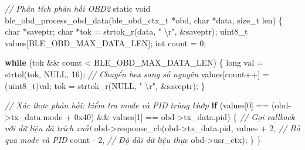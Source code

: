 \documentclass[a4paper]{extarticle}
\newenvironment{Shaded}{}{}
\newcommand{\BaseNTok}[1]{\textcolor[rgb]{0.25,0.63,0.44}{#1}}
\newcommand{\CommentTok}[1]{\textcolor[rgb]{0.38,0.63,0.69}{\textit{#1}}}
\newcommand{\ControlFlowTok}[1]{\textcolor[rgb]{0.00,0.44,0.13}{\textbf{#1}}}
\newcommand{\DataTypeTok}[1]{\textcolor[rgb]{0.56,0.13,0.00}{#1}}
\newcommand{\DecValTok}[1]{\textcolor[rgb]{0.25,0.63,0.44}{#1}}
\newcommand{\NormalTok}[1]{#1}
\newcommand{\OperatorTok}[1]{\textcolor[rgb]{0.40,0.40,0.40}{#1}}
\newcommand{\SpecialCharTok}[1]{\textcolor[rgb]{0.25,0.44,0.63}{#1}}
\newcommand{\StringTok}[1]{\textcolor[rgb]{0.25,0.44,0.63}{#1}}
\begin{document}
\begin{Shaded}
\begin{Highlighting}[]
\CommentTok{// Phân tích phản hồi OBD2}
\DataTypeTok{static} \DataTypeTok{void}\NormalTok{ ble\_obd\_process\_obd\_data}\OperatorTok{(}\NormalTok{ble\_obd\_ctx\_t }\OperatorTok{*}\NormalTok{obd}\OperatorTok{,}
                                      \DataTypeTok{char} \OperatorTok{*}\NormalTok{data}\OperatorTok{,} \DataTypeTok{size\_t}\NormalTok{ len}\OperatorTok{)}
\OperatorTok{\{}
    \DataTypeTok{char} \OperatorTok{*}\NormalTok{saveptr}\OperatorTok{;}
    \DataTypeTok{char} \OperatorTok{*}\NormalTok{tok }\OperatorTok{=}\NormalTok{ strtok\_r}\OperatorTok{(}\NormalTok{data}\OperatorTok{,} \StringTok{" }\SpecialCharTok{\textbackslash{}r}\StringTok{"}\OperatorTok{,} \OperatorTok{\&}\NormalTok{saveptr}\OperatorTok{);}
    \DataTypeTok{uint8\_t}\NormalTok{ values}\OperatorTok{[}\NormalTok{BLE\_OBD\_MAX\_DATA\_LEN}\OperatorTok{];}
    \DataTypeTok{int}\NormalTok{ count }\OperatorTok{=} \DecValTok{0}\OperatorTok{;}

    \ControlFlowTok{while} \OperatorTok{(}\NormalTok{tok }\OperatorTok{\&\&}\NormalTok{ count }\OperatorTok{\textless{}}\NormalTok{ BLE\_OBD\_MAX\_DATA\_LEN}\OperatorTok{)} \OperatorTok{\{}
        \DataTypeTok{long}\NormalTok{ val }\OperatorTok{=}\NormalTok{ strtol}\OperatorTok{(}\NormalTok{tok}\OperatorTok{,}\NormalTok{ NULL}\OperatorTok{,} \DecValTok{16}\OperatorTok{);}  \CommentTok{// Chuyển hex sang số nguyên}
\NormalTok{        values}\OperatorTok{[}\NormalTok{count}\OperatorTok{++]} \OperatorTok{=} \OperatorTok{(}\DataTypeTok{uint8\_t}\OperatorTok{)}\NormalTok{val}\OperatorTok{;}
\NormalTok{        tok }\OperatorTok{=}\NormalTok{ strtok\_r}\OperatorTok{(}\NormalTok{NULL}\OperatorTok{,} \StringTok{" }\SpecialCharTok{\textbackslash{}r}\StringTok{"}\OperatorTok{,} \OperatorTok{\&}\NormalTok{saveptr}\OperatorTok{);}
    \OperatorTok{\}}

    \CommentTok{// Xác thực phản hồi: kiểm tra mode và PID trùng khớp}
    \ControlFlowTok{if} \OperatorTok{(}\NormalTok{values}\OperatorTok{[}\DecValTok{0}\OperatorTok{]} \OperatorTok{==} \OperatorTok{(}\NormalTok{obd}\OperatorTok{{-}\textgreater{}}\NormalTok{tx\_data}\OperatorTok{.}\NormalTok{mode }\OperatorTok{+} \BaseNTok{0x40}\OperatorTok{)} \OperatorTok{\&\&}
\NormalTok{        values}\OperatorTok{[}\DecValTok{1}\OperatorTok{]} \OperatorTok{==}\NormalTok{ obd}\OperatorTok{{-}\textgreater{}}\NormalTok{tx\_data}\OperatorTok{.}\NormalTok{pid}\OperatorTok{)} \OperatorTok{\{}
        \CommentTok{// Gọi callback với dữ liệu đã trích xuất}
\NormalTok{        obd}\OperatorTok{{-}\textgreater{}}\NormalTok{response\_cb}\OperatorTok{(}\NormalTok{obd}\OperatorTok{{-}\textgreater{}}\NormalTok{tx\_data}\OperatorTok{.}\NormalTok{pid}\OperatorTok{,}
\NormalTok{                         values }\OperatorTok{+} \DecValTok{2}\OperatorTok{,}      \CommentTok{// Bỏ qua mode và PID}
\NormalTok{                         count }\OperatorTok{{-}} \DecValTok{2}\OperatorTok{,}       \CommentTok{// Độ dài dữ liệu thực}
\NormalTok{                         obd}\OperatorTok{{-}\textgreater{}}\NormalTok{usr\_ctx}\OperatorTok{);}
    \OperatorTok{\}}
\OperatorTok{\}}
\end{Highlighting}
\end{Shaded}
\end{document}

